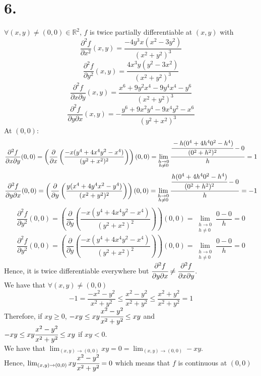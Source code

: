 \documentclass[11pt]{article}
\begin{document}
\section*{6.}
$\forall (x, y) \ne (0,0) \in \mathbb{R}^2$, $f$ is twice partially differentiable at $(x,y)$ with \\
\[
\frac{\partial^2 f}{\partial x^2}(x,y) = \frac{-4y^3x(x^2-3y^2)}{(x^2+y^2)^3}
\]
\[
\frac{\partial^2 f}{\partial y^2}(x,y) = \frac{4x^3y(y^2-3x^2)}{(x^2+y^2)^3}
\]
\[
\frac{\partial^2 f}{\partial x \partial y}(x,y) = \frac{x^6 + 9y^2x^4 - 9y^4x^4 -y^6}{(x^2+y^2)^3}
\]
\[
\frac{\partial^2 f}{\partial y \partial x}(x,y) = -\frac{y^6 + 9x^2y^4 -9x^4y^2 - x^6}{(y^2+x^2)^3}
\]
At $(0,0)$:
\[
\frac{\partial^2 f}{\partial x \partial y}(0,0) = \left( \frac{\partial}{\partial x} \left( \frac{-x(y^4+4x^4y^2-x^4)}{(y^2 + x^2)^2}\right) \right)(0,0) = \lim_{\substack{h \to 0 \\ h \ne 0}} \frac{\cfrac{-h(0^4 + 4h^40^2 -h^4)}{(0^2 + h^2)^2}-0}{h} = 1
\]
\[
\frac{\partial^2 f}{\partial y \partial x}(0,0) = \left( \frac{\partial}{\partial y} \left( \frac{y(x^4+4y^4x^2-y^4)}{(x^2 + y^2)^2}\right) \right)(0,0) = \lim_{\substack{h \to 0 \\ h \ne 0}} \frac{\cfrac{h(0^4 + 4h^40^2 -h^4)}{(0^2 + h^2)^2}-0}{h} = -1
\]
\[
\frac{\partial^2 f}{\partial y^2}(0,0) = \left( \frac{\partial}{\partial y} \left( \frac{-x(y^4+4x^4y^2-x^4)}{(y^2 + x^2)^2}\right) \right)(0,0) = \lim_{\substack{h \to 0 \\ h \ne 0}} \frac{0-0}{h} = 0
\]
\[
\frac{\partial^2 f}{\partial y^2}(0,0) = \left( \frac{\partial}{\partial y} \left( \frac{-x(y^4+4x^4y^2-x^4)}{(y^2 + x^2)^2}\right) \right)(0,0) = \lim_{\substack{h \to 0 \\ h \ne 0}} \frac{0-0}{h} = 0
\]
Hence, it is twice differentiable everywhere but $\cfrac{\partial^2 f}{\partial y \partial x} \ne \cfrac{\partial^2 f}{\partial x \partial y}$. \\
We have that $\forall (x,y) \ne (0,0)$
\[
-1 = \frac{-x^2-y^2}{x^2+y^2} \le \frac{x^2-y^2}{x^2+y^2} \le \frac{x^2+y^2}{x^2+y^2} = 1
\]
Therefore, if $xy \ge 0$, $-xy \le xy\cfrac{x^2-y^2}{x^2+y^2}\le xy$ and \\
$-xy \le xy\cfrac{x^2-y^2}{x^2+y^2}\le xy$ if $xy <0$. \\
We have that $\lim_{(x,y) \to (0,0)} xy = 0 = \lim_{(x,y) \to (0,0)} -xy$. \\
Hence, $\lim_{(x,y) \to (0,0)}xy\cfrac{x^2-y^2}{x^2+y^2} = 0$ which means that $f$ is continuous at $(0,0)$
\end{document}
